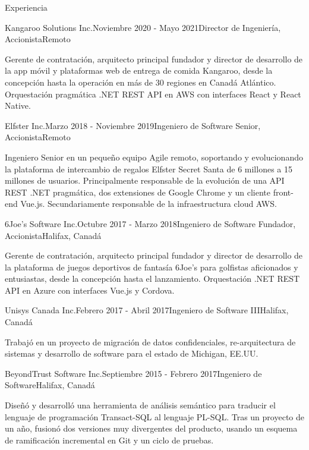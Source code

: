 \documentclass{resume} %
\begin{document}
\begin{rSection}{Experiencia}
		\begin{rSubsection}{Kangaroo Solutions Inc.}{Noviembre 2020 - Mayo 2021}{Director de Ingeniería, Accionista}{Remoto}
			\item[] Gerente de contratación, arquitecto principal fundador y director de desarrollo de la app móvil y plataformas web de entrega de comida Kangaroo, desde la concepción hasta la operación en más de 30 regiones en Canadá Atlántico. Orquestación pragmática .NET REST API en AWS con interfaces React y React Native.
		\end{rSubsection}
		

		
		\begin{rSubsection}{Elfster Inc.}{Marzo 2018 - Noviembre 2019}{Ingeniero de Software Senior, Accionista}{Remoto}
			\item[] Ingeniero Senior en un pequeño equipo Agile remoto, soportando y evolucionando la plataforma de intercambio de regalos Elfster Secret Santa de 6 millones a 15 millones de usuarios. Principalmente responsable de la evolución de una API REST .NET pragmática, dos extensiones de Google Chrome y un cliente front-end Vue.js. Secundariamente responsable de la infraestructura cloud AWS.
		\end{rSubsection}
		
		\begin{rSubsection}{6Joe's Software Inc.}{Octubre 2017 - Marzo 2018}{Ingeniero de Software Fundador, Accionista}{Halifax, Canadá}
			\item[] Gerente de contratación, arquitecto principal fundador y director de desarrollo de la plataforma de juegos deportivos de fantasía 6Joe's para golfistas aficionados y entusiastas, desde la concepción hasta el lanzamiento. Orquestación .NET REST API en Azure con interfaces Vue.js y Cordova.
		\end{rSubsection}
		
		\begin{rSubsection}{Unisys Canada Inc.}{Febrero 2017 - Abril 2017}{Ingeniero de Software III}{Halifax, Canadá}
			\item[] Trabajó en un proyecto de migración de datos confidenciales, re-arquitectura de sistemas y desarrollo de software para el estado de Michigan, EE.UU.
		\end{rSubsection}
		
		\begin{rSubsection}{BeyondTrust Software Inc.}{Septiembre 2015 - Febrero 2017}{Ingeniero de Software}{Halifax, Canadá}
			\item[] Diseñó y desarrolló una herramienta de análisis semántico para traducir el lenguaje de programación Transact-SQL al lenguaje PL-SQL. Tras un proyecto de un año, fusionó dos versiones muy divergentes del producto, usando un esquema de ramificación incremental en Git y un ciclo de pruebas.
		\end{rSubsection}
		

\end{rSection}
\end{document}
